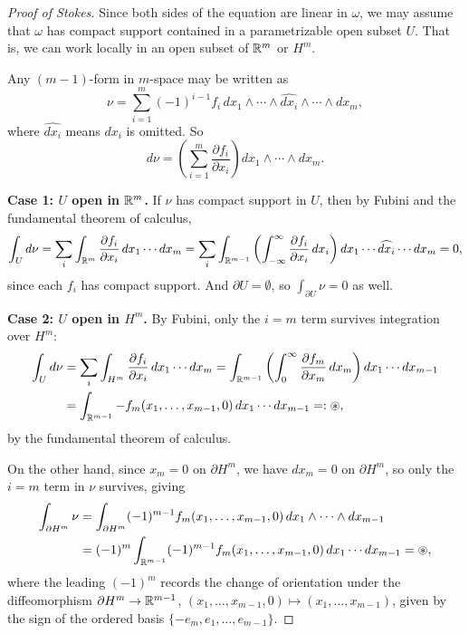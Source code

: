 \begin{proof}[Proof of Stokes]
    Since both sides of the equation are linear in $\omega$, we may assume that $\omega$ has compact support contained in a parametrizable open subset $U$. That is, we can work locally in an open subset of $\mathbb{R}^m$ or $H^m$.

    Any $(m-1)$-form in $m$-space may be written as
    \[
        \nu = \sum_{i=1}^{m} (-1)^{i-1} f_i\, dx_1 \wedge \cdots \wedge \widehat{dx_i} \wedge \cdots \wedge dx_m,
    \]
    where $\widehat{dx_i}$ means $dx_i$ is omitted. So
    \[
        d\nu = \left( \sum_{i=1}^{m} \frac{\partial f_i}{\partial x_i} \right) dx_1 \wedge \cdots \wedge dx_m.
    \]

    \textbf{Case 1: $U$ open in $\mathbb{R}^m$.} If $\nu$ has compact support in $U$, then by Fubini and the fundamental theorem of calculus,
    \[
        \int_U d\nu = \sum_i \int_{\mathbb{R}^m} \frac{\partial f_i}{\partial x_i}\, dx_1 \cdots dx_m = \sum_i \int_{\mathbb{R}^{m-1}} \left( \int_{-\infty}^{\infty} \frac{\partial f_i}{\partial x_i}\, dx_i \right) dx_1 \cdots \widehat{dx_i} \cdots dx_m = 0,
    \]
    since each $f_i$ has compact support. And $\partial U = \emptyset$, so $\int_{\partial U} \nu = 0$ as well.

    \textbf{Case 2: $U$ open in $H^m$.} By Fubini, only the $i = m$ term survives integration over $H^m$:
    \begin{align*}
        \int_U d\nu &= \sum_i \int_{H^m} \frac{\partial f_i}{\partial x_i}\, dx_1 \cdots dx_m = \int_{\mathbb{R}^{m-1}} \left( \int_0^\infty \frac{\partial f_m}{\partial x_m}\, dx_m \right) dx_1 \cdots dx_{m-1} \\
        &= \int_{\mathbb{R}^{m-1}} -f_m(x_1, \ldots, x_{m-1}, 0)\, dx_1 \cdots dx_{m-1} =: \circledast,
    \end{align*}
    by the fundamental theorem of calculus.

    On the other hand, since $x_m = 0$ on $\partial H^m$, we have $dx_m = 0$ on $\partial H^m$, so only the $i = m$ term in $\nu$ survives, giving
    \begin{align*}
        \int_{\partial H^m} \nu &= \int_{\partial H^m} (-1)^{m-1} f_m(x_1, \ldots, x_{m-1}, 0)\, dx_1 \wedge \cdots \wedge dx_{m-1} \\
        &= (-1)^m \int_{\mathbb{R}^{m-1}} (-1)^{m-1} f_m(x_1, \ldots, x_{m-1}, 0)\, dx_1 \cdots dx_{m-1} = \circledast,
    \end{align*}
    where the leading $(-1)^m$ records the change of orientation under the diffeomorphism $\partial H^m \to \mathbb{R}^{m-1}$, $(x_1, \ldots, x_{m-1}, 0) \mapsto (x_1, \ldots, x_{m-1})$, given by the sign of the ordered basis $\{-e_m, e_1, \ldots, e_{m-1}\}$.
\end{proof}

